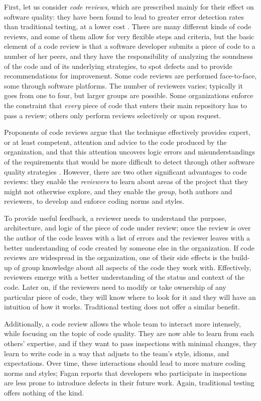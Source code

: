 First, let us consider \emph{code reviews}, which are prescribed mainly for their effect on software quality: they have been found to lead to greater error detection rates than traditional testing, at a lower cost \cite{Fagan1986}. There are many different kinds of code reviews, and some of them allow for very flexible steps and criteria, but the basic element of a code review is that a software developer submits a piece of code to a number of her peers, and they have the responsibility of analyzing the soundness of the code and of its underlying strategies, to spot defects and to provide recommendations for improvement. Some code reviews are performed face-to-face, some through software platforms. The number of reviewers varies; typically it goes from one to four, but larger groups are possible. Some organizations enforce the constraint that \emph{every} piece of code that enters their main repository has to pass a review; others only perform reviews selectively or upon request.

Proponents of code reviews argue that the technique effectively provides expert, or at least competent, attention and advice to the code produced by the organization, and that this attention uncovers logic errors and misunderstandings of the requirements that would be more difficult to detect through other software quality strategies \cite{Shull2002}. However, there are two other significant advantages to code reviews: they enable the \emph{reviewers} to learn about areas of the project that they might not otherwise explore, and they enable the \emph{group}, both authors and reviewers, to develop and enforce coding norms and styles.

To provide useful feedback, a reviewer needs to understand the purpose, architecture, and logic of the piece of code under review; once the review is over the author of the code leaves with a list of errors and the reviewer leaves with a better understanding of code created by someone else in the organization. If code reviews are widespread in the organization, one of their side effects is the build-up of group knowledge about all aspects of the code they work with. Effectively, reviewers emerge with a better understanding of the status and context of the code. Later on, if the reviewers need to modify or take ownership of any particular piece of code, they will know where to look for it and they will have an intuition of how it works. Traditional testing does not offer a similar benefit.

Additionally, a code review allows the whole team to interact more intensely, while focusing on the topic of code quality. They are now able to learn from each others' expertise, and if they want to pass inspections with minimal changes, they learn to write code in a way that adjusts to the team's style, idioms, and expectations. Over time, these interactions should lead to more mature coding norms and styles; Fagan  reports that developers who participate in inspections are less prone to introduce defects in their future work. Again, traditional testing offers nothing of the kind.

